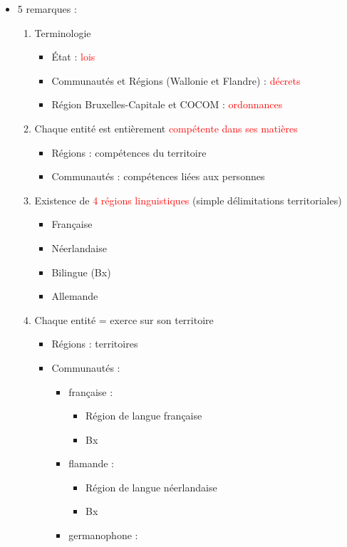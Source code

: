 \begin{itemize}
	\item 5 remarques :
	\begin{enumerate}
		\item Terminologie
		\begin{itemize}
			\item État : \textcolor{red}{lois}
			\item Communautés et Régions (Wallonie et Flandre) : \textcolor{red}{décrets}
			\item Région Bruxelles-Capitale et COCOM : \textcolor{red}{ordonnances}
		\end{itemize}
		\item Chaque entité est entièrement \textcolor{red}{compétente dans ses matières}
		\begin{itemize}
			\item Régions : compétences du territoire
			\item Communautés : compétences liées aux personnes
		\end{itemize}
		\item Existence de \textcolor{red}{4 régions linguistiques} (simple délimitations territoriales)
		\begin{itemize}
			\item Française
			\item Néerlandaise
			\item Bilingue (Bx)
			\item Allemande
		\end{itemize}
		\item Chaque entité = exerce sur son territoire
		\begin{itemize}
			\item Régions : territoires
			\item Communautés :
			\begin{itemize}
				\item française :
				\begin{itemize}
					\item Région de langue française
					\item Bx
				\end{itemize}
				\item flamande :
				\begin{itemize}
					\item Région de langue néerlandaise
					\item Bx
				\end{itemize}
				\item germanophone :

\end{itemize}
\end{itemize}
\end{enumerate}
\end{itemize}
